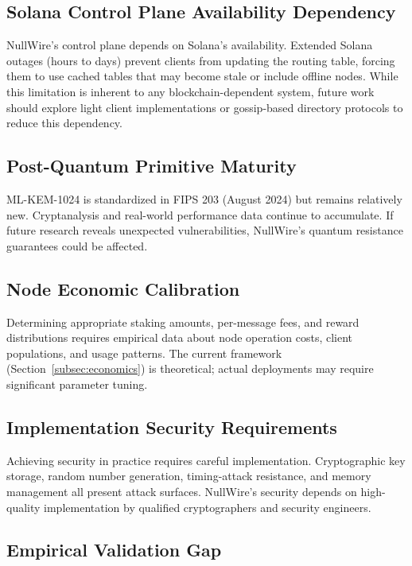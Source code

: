 \documentclass[11pt]{article}
\theoremstyle{definition}
\theoremstyle{remark}
\begin{document}
\subsection{Solana Control Plane Availability Dependency}

NullWire's control plane depends on Solana's availability. Extended Solana outages (hours to days) prevent clients from updating the routing table, forcing them to use cached tables that may become stale or include offline nodes. While this limitation is inherent to any blockchain-dependent system, future work should explore light client implementations or gossip-based directory protocols to reduce this dependency.

\subsection{Post-Quantum Primitive Maturity}

ML-KEM-1024 is standardized in FIPS 203 (August 2024) but remains relatively new. Cryptanalysis and real-world performance data continue to accumulate. If future research reveals unexpected vulnerabilities, NullWire's quantum resistance guarantees could be affected.

\subsection{Node Economic Calibration}

Determining appropriate staking amounts, per-message fees, and reward distributions requires empirical data about node operation costs, client populations, and usage patterns. The current framework (Section~\ref{subsec:economics}) is theoretical; actual deployments may require significant parameter tuning.

\subsection{Implementation Security Requirements}

Achieving security in practice requires careful implementation. Cryptographic key storage, random number generation, timing-attack resistance, and memory management all present attack surfaces. NullWire's security depends on high-quality implementation by qualified cryptographers and security engineers.

\subsection{Empirical Validation Gap}
\end{document}

